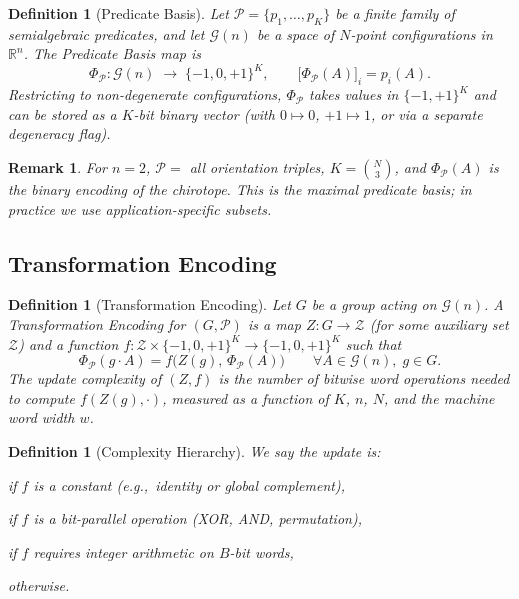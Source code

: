 \documentclass[11pt,letterpaper]{article}
\newtheorem{definition}[theorem]{Definition}
\newtheorem{remark}[theorem]{Remark}
\newcommand{\RR}{\mathbb{R}}
\newcommand{\PhiP}{\Phi_{\mathcal{P}}}
\newcommand{\cP}{\mathcal{P}}
\newcommand{\cO}{\mathcal{O}}
\newcommand{\wt}{w}       %
\begin{document}
\begin{definition}[Predicate Basis]\label{def:pb}
Let $\cP=\{p_1,\dots,p_K\}$ be a finite family of semialgebraic predicates, and let
$\mathcal{G}(n)$ be a space of $N$-point configurations in $\RR^n$.  The
\emph{Predicate Basis map} is
\[
  \PhiP : \mathcal{G}(n) \;\longrightarrow\; \{-1,0,+1\}^K,\qquad
  \bigl[\PhiP(A)\bigr]_i = p_i(A).
\]
Restricting to non-degenerate configurations, $\PhiP$ takes values in $\{-1,+1\}^K$ and
can be stored as a $K$-bit binary vector (with $0\mapsto 0$, $+1\mapsto 1$, or via a
separate degeneracy flag).
\end{definition}

\begin{remark}
For $n=2$, $\cP=$ all orientation triples, $K=\binom{N}{3}$, and $\PhiP(A)$ is the
binary encoding of the chirotope.  This is the maximal predicate basis; in practice we
use application-specific subsets.
\end{remark}

\subsection{Transformation Encoding}

\begin{definition}[Transformation Encoding]\label{def:te}
Let $G$ be a group acting on $\mathcal{G}(n)$.  A \emph{Transformation Encoding} for
$(G,\cP)$ is a map $Z:G\to\mathcal{Z}$ (for some auxiliary set $\mathcal{Z}$) and a
function $f:\mathcal{Z}\times\{-1,0,+1\}^K\to\{-1,0,+1\}^K$ such that
\[
  \PhiP(g\cdot A) = f\!\bigl(Z(g),\,\PhiP(A)\bigr) \qquad \forall A\in\mathcal{G}(n),\; g\in G.
\]
The \emph{update complexity} of $(Z,f)$ is the number of bitwise word operations needed
to compute $f(Z(g),\cdot)$, measured as a function of $K$, $n$, $N$, and the machine
word width $\wt$.
\end{definition}

\begin{definition}[Complexity Hierarchy]\label{def:hierarchy}
We say the update is:
\begin{description}[nosep,leftmargin=2.5em]
\item[$\cO(1)$-trivial] if $f$ is a constant (e.g.,\ identity or global complement),
\item[$\cO(K/\wt)$-bitwise] if $f$ is a bit-parallel operation (XOR, AND, permutation),
\item[$\cO(K\cdot B/\wt)$-arithmetic] if $f$ requires integer arithmetic on $B$-bit words,
\item[intractable] otherwise.
\end{description}
\end{definition}
\end{document}
